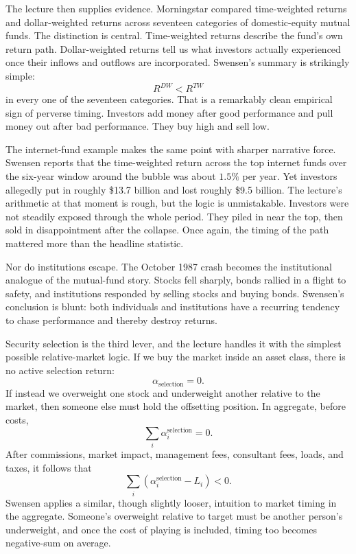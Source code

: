 The lecture then supplies evidence. Morningstar compared time-weighted returns and dollar-weighted returns across seventeen categories of domestic-equity mutual funds. The distinction is central. Time-weighted returns describe the fund's own return path. Dollar-weighted returns tell us what investors actually experienced once their inflows and outflows are incorporated. Swensen's summary is strikingly simple:
\begin{equation}
R^{DW}<R^{TW}
\end{equation}
in every one of the seventeen categories. That is a remarkably clean empirical sign of perverse timing. Investors add money after good performance and pull money out after bad performance. They buy high and sell low.

The internet-fund example makes the same point with sharper narrative force. Swensen reports that the time-weighted return across the top internet funds over the six-year window around the bubble was about \(1.5\%\) per year. Yet investors allegedly put in roughly \$13.7 billion and lost roughly \$9.5 billion. The lecture's arithmetic at that moment is rough, but the logic is unmistakable. Investors were not steadily exposed through the whole period. They piled in near the top, then sold in disappointment after the collapse. Once again, the timing of the path mattered more than the headline statistic.

Nor do institutions escape. The October 1987 crash becomes the institutional analogue of the mutual-fund story. Stocks fell sharply, bonds rallied in a flight to safety, and institutions responded by selling stocks and buying bonds. Swensen's conclusion is blunt: both individuals and institutions have a recurring tendency to chase performance and thereby destroy returns.

Security selection is the third lever, and the lecture handles it with the simplest possible relative-market logic. If we buy the market inside an asset class, there is no active selection return:
\begin{equation}
\alpha_{\text{selection}}=0.
\end{equation}
If instead we overweight one stock and underweight another relative to the market, then someone else must hold the offsetting position. In aggregate, before costs,
\begin{equation}
\sum_i \alpha_i^{\text{selection}}=0.
\end{equation}
After commissions, market impact, management fees, consultant fees, loads, and taxes, it follows that
\begin{equation}
\sum_i\left(\alpha_i^{\text{selection}}-L_i\right)<0.
\end{equation}
Swensen applies a similar, though slightly looser, intuition to market timing in the aggregate. Someone's overweight relative to target must be another person's underweight, and once the cost of playing is included, timing too becomes negative-sum on average.

